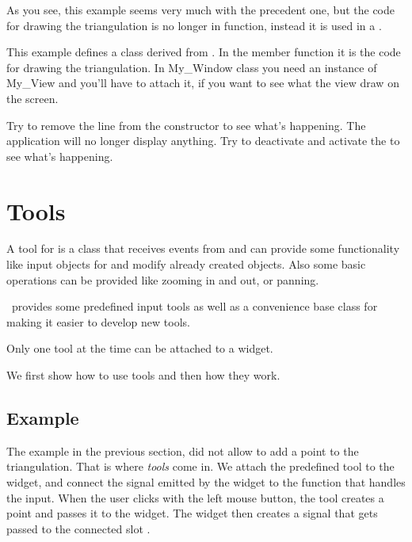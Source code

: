 As you see, this example seems very much with the precedent one, but
the code for drawing the triangulation is no longer in 
 function, instead it is used in a .

This example defines a class derived from . In the member
function  it is the code for drawing the triangulation. In 
My\_Window class you need an instance of My\_View and you'll have to attach it,
if you want to see what the view draw on the screen.

Try to remove the line  from the constructor to see
what's happening. The application will no longer display anything. Try to
deactivate and activate the  to see what's happening.


\section{Tools}
\label{Qt_widget_tools}

A tool for  is a class that receives events from
 and can provide some functionality like input
objects for  and modify already created
objects. Also some basic operations can be provided like zooming in
and out, or panning.

\cgal\ provides some predefined input tools as well as a convenience base class 
 for making it easier to develop new tools.

Only one tool at the time can be attached to a widget.

We first show how to use tools and then how they work.

\subsection{Example}

The example in the previous section, did not allow to add a point to the triangulation.
That is where {\em  tools} come in. We attach the predefined tool 
to the widget, and connect the signal emitted by the widget to the function that 
handles the input.  When the user clicks with the left mouse button, the tool creates
a point and passes it to the widget. The widget then creates a signal that gets passed
to the connected slot .

